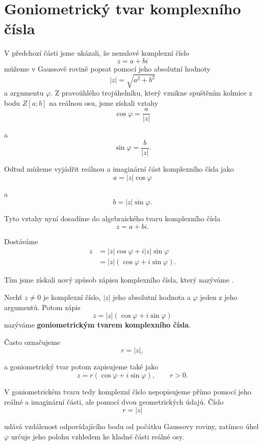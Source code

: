 \documentclass[12pt,a4paper]{article}
\begin{document}

\section{Goniometrický tvar komplexního čísla}
V předchozí části jsme ukázali, že nenulové komplexní číslo
\[
    z=a+bi
\]
můžeme v Gaussově rovině popsat pomocí jeho absolutní hodnoty
\[
    |z|=\sqrt{a^2+b^2}
\]
a argumentu $\varphi$. 
Z pravoúhlého trojúhelníku, který vznikne spuštěním kolmice z bodu $Z[a;b]$ na reálnou osu, 
jsme získali vztahy
\[
    \cos\varphi=\frac{a}{|z|}
\]

a
\[
    \sin\varphi=\frac{b}{|z|}.
\]

Odtud můžeme vyjádřit reálnou a imaginární část komplexního čísla jako
\[
    a=|z|\cos\varphi
\]

a
\[
    b=|z|\sin\varphi.
\]

Tyto vztahy nyní dosadíme do algebraického tvaru komplexního čísla
\[
    z=a+bi.
\]

Dostáváme
\begin{align*}
    z   &= |z|\cos\varphi+i|z|\sin\varphi \\
        &= |z|\left(\cos\varphi+i\sin\varphi\right).
\end{align*}

Tím jsme získali nový způsob zápisu komplexního čísla, který nazýváme
.

\begin{definitionbox}
    Nechť $z\neq0$ je komplexní číslo, $|z|$ jeho absolutní hodnota a $\varphi$
    jeden z jeho argumentů. Potom zápis
    \[
        z=|z|\left(\cos\varphi+i\sin\varphi\right)
    \]
    nazýváme \textbf{goniometrickým tvarem komplexního čísla}.
    
    Často označujeme
    \[
        r=|z|,
    \]

    a goniometrický tvar potom zapisujeme také jako
    \[
        z=r\left(\cos\varphi+i\sin\varphi\right),
        \qquad r>0.
    \]
\end{definitionbox}

V goniometrickém tvaru tedy komplexní číslo nepopisujeme přímo pomocí jeho reálné
a imaginární části, ale pomocí dvou geometrických údajů. Číslo
\[
    r=|z|
\]

udává vzdálenost odpovídajícího bodu od počátku Gaussovy roviny, 
zatímco úhel $\varphi$ určuje jeho polohu vzhledem ke kladné části reálné osy.
\end{document}

